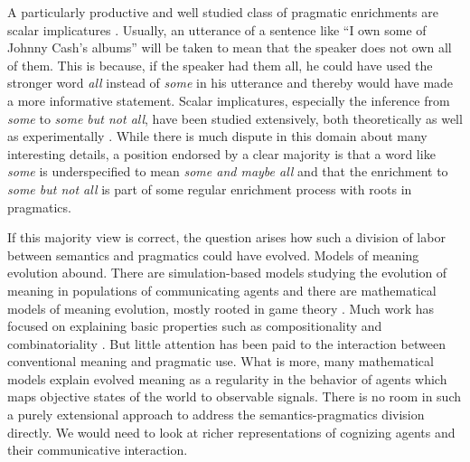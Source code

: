 \documentclass[a4paper]{article}
\begin{document}
A particularly productive and well studied class of pragmatic enrichments are scalar
implicatures
\citep{horn:1984,Hirschberg1985:A-Theory-of-Sca,LevinsonPragmatics1983,Geurts2010:Quantity-Implic}. Usually,
an utterance of a sentence like ``I own some of Johnny Cash's albums'' will be taken to mean
that the speaker does not own all of them. This is because, if the speaker had them all, he
could have used the stronger word \emph{all} instead of \emph{some} in his utterance and
thereby would have made a more informative statement. Scalar implicatures, especially the
inference from \emph{some} to \emph{some but not all}, have been studied extensively, both
theoretically
\citep[e.g.][]{Sauerland2004:Scalar-Implicat,ChierchiaFox2008:The-Grammatical,Rooyvan-RooijJagerde-Jager2012:Explaining-Quan}
as well as experimentally
\citep[e.g.][]{BottNoveck2004:Some-Utterances,huang+snedeker:2009,GrodnerKlein2010:Some-and-Possib,GoodmanStuhlmuller2013:Knowledge-and-I,DegenTanenhaus2012:Processing-Scal}. While
there is much dispute in this domain about many interesting details, a position endorsed by a
clear majority is that a word like \emph{some} is underspecified to mean \emph{some and maybe
  all} and that the enrichment to \emph{some but not all} is part of some regular enrichment
process with roots in pragmatics.

If this majority view is correct, the question arises how such a division of labor between
semantics and pragmatics could have evolved. Models of meaning evolution abound. There are
simulation-based models studying the evolution of meaning in populations of communicating
agents
\citep{Hurford1989:Biological-Evol,Steels1995:A-Self-Organizi,LenaertsJansen2005:The-Evolutionar,SteelsBelpaeme2005:Coordinating-Pe,BaronchelliPuglisi2008:Cultural-route-,steels:2011,SpikeStadler2016:Minimal-Require}
and there are mathematical models of meaning evolution, mostly rooted in game theory
\citep{lewis:1969,Warneryd1993:Cheap-Talk-Coor,BlumeKim1993:Evolutionary-St,nowak+krakauer:1999,Huttegger2007:Evolution-and-t,Skyrms2010:Signals}. Much
work has focused on explaining basic properties such as compositionality and combinatoriality
\citep[e.g.][]{Batali1998:Computational-S,nowak+krakauer:1999,nowak+etal:2000,KirbyHurford2002:The-Emergence-o,kirby:2002,SmithKirby2003:Iterated-Learni,Gong2007:Language-Evolut,kirby+etal:2015,verhoef+etal:2014,Franke2015:Proto-Syntax}. But
little attention has been paid to the interaction between conventional meaning and pragmatic
use. What is more, many mathematical models explain evolved meaning as a regularity in the
behavior of agents which maps objective states of the world to observable signals. There is no
room in such a purely extensional approach to address the semantics-pragmatics division
directly. We would need to look at richer representations of cognizing agents and their
communicative interaction.  
\end{document}
